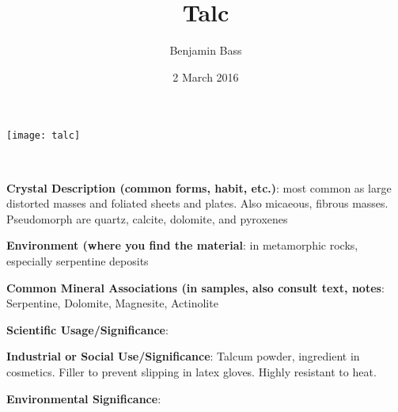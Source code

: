 \documentclass[10pt]{article}
\author{Benjamin Bass}
\date{2 March 2016}
\title{\vspace{-2.0cm}Talc} %
\begin{document}
\maketitle


\begin{center}
  \texttt{[image: talc]}
\end{center}



\
\
\
\
\
\
\
\
\
\

\begin{framed}
  \textbf{Crystal Description (common forms, habit, etc.)}: most common as large distorted masses and foliated sheets and plates. Also micaeous, fibrous masses. Pseudomorph are quartz, calcite, dolomite, and pyroxenes
\end{framed}

\begin{framed}
  \textbf{Environment (where you find the material}: in metamorphic rocks, especially serpentine deposits
\end{framed}

\begin{framed}
  \textbf{Common Mineral Associations (in samples, also consult text, notes}: Serpentine, Dolomite, Magnesite, Actinolite
\end{framed}

\begin{framed}
  \textbf{Scientific Usage/Significance}: 
\end{framed}

\begin{framed}
  \textbf{Industrial or Social Use/Significance}: Talcum powder, ingredient in cosmetics. Filler to prevent slipping in latex gloves. Highly resistant to heat.
\end{framed}

\begin{framed}
  \textbf{Environmental Significance}: 
\end{framed}

\end{document}
